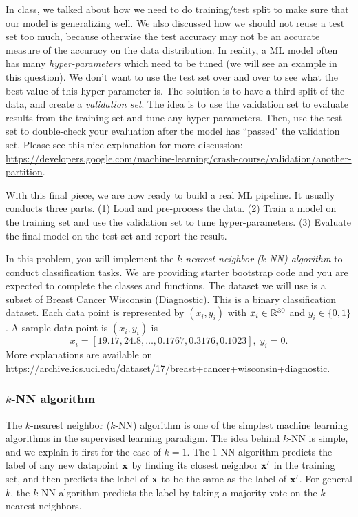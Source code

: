 In class, we talked about how we need to do training/test split to make sure that our model is generalizing well. We also discussed how we should not reuse a test set too much, because otherwise the test accuracy may not be an accurate measure of the accuracy on the data distribution. In reality, a ML model often has many \emph{hyper-parameters} which need to be tuned (we will see an example in this question). We don't want to use the test set over and over to see what the best value of this hyper-parameter is. The solution is to have a third split of the data, and create a \emph{validation set}. The idea is to use the validation set to evaluate results from the training set and tune any hyper-parameters. Then, use the test set to double-check your evaluation after the model has ``passed" the validation set. Please see this nice explanation for more discussion: \url{https://developers.google.com/machine-learning/crash-course/validation/another-partition}.

With this final piece, we are now ready to build a real ML pipeline. It usually conducts three parts. (1) Load and pre-process the data. (2) Train a model on the training set and use the {validation set} to tune hyper-parameters. (3) Evaluate the final model on the test set and report the result.

In this problem, you will implement the \emph{$k$-nearest neighbor ($k$-NN) algorithm} to conduct classification tasks. We are providing starter bootstrap code and you are expected to complete the classes and functions. The dataset we will use is a subset of Breast Cancer Wisconsin (Diagnostic). This is a binary classification dataset. Each data point is represented by $(x_i, y_i)$ with $x_i\in \mathbb{R}^{30}$ and $y_i\in \{0,1\}$. A sample data point is $(x_i,y_i)$ is $$x_i=[19.17, 24.8, \dots , 0.1767, 0.3176, 0.1023], \; y_i=0.$$ More explanations are available on \url{https://archive.ics.uci.edu/dataset/17/breast+cancer+wisconsin+diagnostic}.

\subsubsection*{$k$-NN algorithm}
The $k$-nearest neighbor ($k$-NN) algorithm is one of the simplest machine learning algorithms in the supervised learning paradigm. The idea behind $k$-NN is simple, and we explain it first for the case of $k=1$. The 1-NN algorithm predicts the label of any new datapoint $\mathbf{x}$ by finding its closest neighbor $\mathbf{x}'$ in the training set, and then predicts the label of $\mathbf{x}$ to be the same as the label of $\mathbf{x}'$. For general $k$, the $k$-NN algorithm predicts the label by taking a majority vote on the $k$ nearest neighbors.

